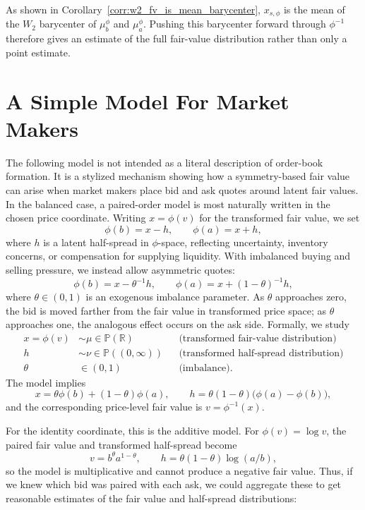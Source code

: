 %
\begin{remark}
    As shown in Corollary~\ref{corr:w2_fv_is_mean_barycenter}, $x_{s,\phi}$ is the mean of the $W_2$ barycenter of $\mu_b^\phi$ and $\mu_a^\phi$. Pushing this barycenter forward through $\phi^{-1}$ therefore gives an estimate of the full fair-value distribution rather than only a point estimate.
\end{remark}


\section{A Simple Model For Market Makers}

The following model is not intended as a literal description of order-book
formation. It is a stylized mechanism showing how a symmetry-based fair value
can arise when market makers place bid and ask quotes around latent fair values.
In the balanced case, a paired-order model is most naturally written in the
chosen price coordinate. Writing $x=\phi(v)$ for the transformed fair value, we set
%
\[\phi(b)=x-h, \qquad \phi(a)=x+h,\]
%
where $h$ is a latent half-spread in $\phi$-space, reflecting uncertainty,
inventory concerns, or compensation for supplying liquidity. With imbalanced
buying and selling pressure, we instead allow asymmetric quotes:
%
\[\phi(b)=x-\theta^{-1}h, \qquad
  \phi(a)=x+(1-\theta)^{-1}h,\]
%
where $\theta\in(0,1)$ is an exogenous imbalance parameter. As $\theta$
approaches zero, the bid is moved farther from the fair value in transformed
price space; as $\theta$ approaches one, the analogous effect occurs on the ask
side. Formally, we study
%
\begin{align*}
    x=\phi(v) &\sim \mu \in \mathbb{P}(\mathbb{R})  && \text{(transformed fair-value distribution)} \\
    h &\sim \nu \in \mathbb{P}((0,\infty)) && \text{(transformed half-spread distribution)} \\
    \theta &\in (0,1) && \text{(imbalance)}.
\end{align*}
%
\noindent The model implies
%
\[x=\theta\phi(b)+(1-\theta)\phi(a), \qquad
  h=\theta(1-\theta)\bigl(\phi(a)-\phi(b)\bigr),\]
%
\noindent and the corresponding price-level fair value is $v=\phi^{-1}(x)$.

For the identity coordinate, this is the additive model. For $\phi(v)=\log v$,
the paired fair value and transformed half-spread become
%
\[v=b^\theta a^{1-\theta}, \qquad
h=\theta(1-\theta)\log(a/b),\]
%
\noindent so the model is multiplicative and cannot produce a negative fair value.
%
 Thus, if we knew which bid was paired with each ask, we could aggregate
 these to get reasonable estimates of the fair value and half-spread
 distributions:

